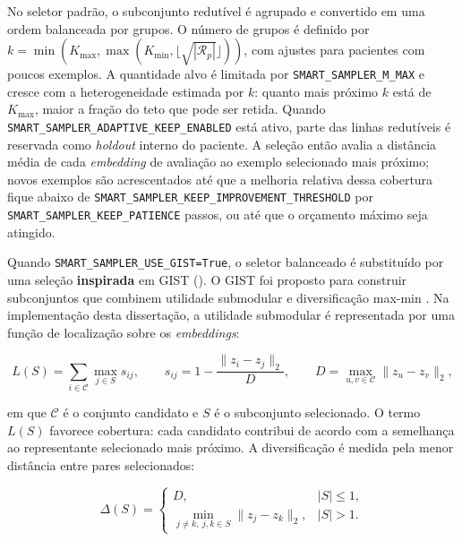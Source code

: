 No seletor padrão, o subconjunto redutível é agrupado e convertido em uma ordem
balanceada por grupos. O número de grupos é definido por
$k=\min(K_{\max},\max(K_{\min},\lfloor\sqrt{|\mathcal{R}_p|}\rfloor))$, com
ajustes para pacientes com poucos exemplos. A quantidade alvo é limitada por
\texttt{SMART\_SAMPLER\_M\_MAX} e cresce com a heterogeneidade estimada por
$k$: quanto mais próximo $k$ está de $K_{\max}$, maior a fração do teto que pode
ser retida. Quando \texttt{SMART\_SAMPLER\_ADAPTIVE\_KEEP\_ENABLED} está ativo,
parte das linhas redutíveis é reservada como \textit{holdout} interno do
paciente. A seleção então avalia a distância média de cada \textit{embedding} de
avaliação ao exemplo selecionado mais próximo; novos exemplos são acrescentados
até que a melhoria relativa dessa cobertura fique abaixo de
\texttt{SMART\_SAMPLER\_KEEP\_IMPROVEMENT\_THRESHOLD} por
\texttt{SMART\_SAMPLER\_KEEP\_PATIENCE} passos, ou até que o orçamento máximo
seja atingido.

Quando \texttt{SMART\_SAMPLER\_USE\_GIST=True}, o seletor balanceado é
substituído por uma seleção \textbf{inspirada} em GIST
(). O GIST foi
proposto para construir subconjuntos que combinem utilidade submodular e
diversificação max-min \cite{fahrbach2025gist}. Na implementação desta
dissertação, a utilidade submodular é representada por uma função de localização
sobre os \textit{embeddings}:

\begin{equation}
    L(S) =
    \sum_{i\in\mathcal{C}}
    \max_{j\in S}
    s_{ij},
    \qquad
    s_{ij}=1-\frac{\lVert z_i-z_j\rVert_2}{D},
    \qquad
    D=\max_{u,v\in\mathcal{C}}\lVert z_u-z_v\rVert_2 ,
    \label{eq:gist_facility_location}
\end{equation}

em que $\mathcal{C}$ é o conjunto candidato e $S$ é o subconjunto selecionado.
O termo $L(S)$ favorece cobertura: cada candidato contribui de acordo com a
semelhança ao representante selecionado mais próximo. A diversificação é medida
pela menor distância entre pares selecionados:

\begin{equation}
    \Delta(S)=
    \begin{cases}
        D, & |S|\le 1,\\
        \min_{j\neq k,\ j,k\in S}\lVert z_j-z_k\rVert_2, & |S|>1.
    \end{cases}
    \label{eq:gist_diversity}
\end{equation}

